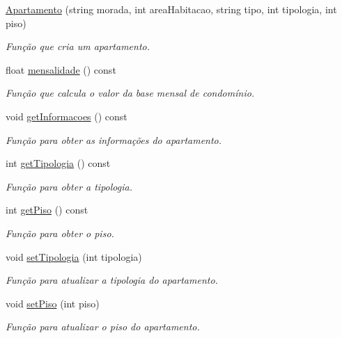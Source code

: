 \begin{DoxyCompactItemize}
\item 
\hyperlink{class_apartamento_a2fc4d48d2f10b3d8c3c6738ac9da9047}{Apartamento} (string morada, int area\+Habitacao, string tipo, int tipologia, int piso)
\begin{DoxyCompactList}\small\item\em Função que cria um apartamento. \end{DoxyCompactList}\item 
float \hyperlink{class_apartamento_a3626df5dabd6871c5f9fce39e8c70249}{mensalidade} () const 
\begin{DoxyCompactList}\small\item\em Função que calcula o valor da base mensal de condomínio. \end{DoxyCompactList}\item 
void \hyperlink{class_apartamento_a272ca1ae1ea5b3ea7bc28388b1b79887}{get\+Informacoes} () const 
\begin{DoxyCompactList}\small\item\em Função para obter as informações do apartamento. \end{DoxyCompactList}\item 
int \hyperlink{class_apartamento_a8f933db9b6eb43fc714246e30b4bcf24}{get\+Tipologia} () const 
\begin{DoxyCompactList}\small\item\em Função para obter a tipologia. \end{DoxyCompactList}\item 
int \hyperlink{class_apartamento_a63f2569f807dc98bb632b4830ed18af4}{get\+Piso} () const 
\begin{DoxyCompactList}\small\item\em Função para obter o piso. \end{DoxyCompactList}\item 
void \hyperlink{class_apartamento_a4d66d10fb8c13d78296df641a640a13b}{set\+Tipologia} (int tipologia)
\begin{DoxyCompactList}\small\item\em Função para atualizar a tipologia do apartamento. \end{DoxyCompactList}\item 
void \hyperlink{class_apartamento_af620ef11e65b67939773cf23bc9a2582}{set\+Piso} (int piso)
\begin{DoxyCompactList}\small\item\em Função para atualizar o piso do apartamento. \end{DoxyCompactList}\end{DoxyCompactItemize}


